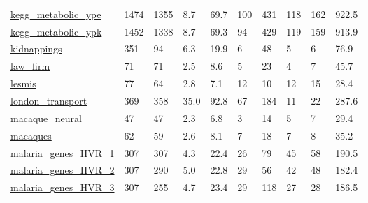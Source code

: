 \begin{longtable}{llllllllll}
 \href{http://santafe.edu/~aaronc/data/kegg2006_metabolic.zip}{kegg\_metabolic\_ype}                                          & 1474       & 1355  & 8.7    & 69.7   & 100   & 431    & 118    & 162    & 922.5   \\
 \href{http://santafe.edu/~aaronc/data/kegg2006_metabolic.zip}{kegg\_metabolic\_ypk}                                          & 1452       & 1338  & 8.7    & 69.3   & 94    & 429    & 119    & 159    & 913.9   \\
 \href{https://sites.google.com/site/ucinetsoftware/datasets/covert-networks/philippinekidnappings}{kidnappings}            & 351        & 94    & 6.3    & 19.9   & 6     & 48     & 5      & 6      & 76.9    \\
 \href{https://manliodedomenico.com/data.php}{law\_firm}                                                                     & 71         & 71    & 2.5    & 8.6    & 5     & 23     & 4      & 7      & 45.7    \\
 \href{http://www-personal.umich.edu/~mejn/netdata}{lesmis}                                                                 & 77         & 64    & 2.8    & 7.1    & 12    & 10     & 12     & 15     & 28.4    \\
 \href{https://manliodedomenico.com/data.php}{london\_transport}                                                             & 369        & 358   & 35.0   & 92.8   & 67    & 184    & 11     & 22     & 287.6   \\
 \href{https://sites.google.com/site/bctnet/datasets}{macaque\_neural}                                                       & 47         & 47    & 2.3    & 6.8    & 3     & 14     & 5      & 7      & 29.4    \\
 \href{http://konect.cc/networks/moreno_mac}{macaques}                                                                      & 62         & 59    & 2.6    & 8.1    & 7     & 18     & 7      & 8      & 35.2    \\
 \href{https://github.com/dblarremore/data_malaria_PLOSCompBiology_2013}{malaria\_genes\_HVR\_1}                               & 307        & 307   & 4.3    & 22.4   & 26    & 79     & 45     & 58     & 190.5   \\
 \href{https://github.com/dblarremore/data_malaria_PLOSCompBiology_2013}{malaria\_genes\_HVR\_2}                               & 307        & 290   & 5.0    & 22.8   & 29    & 56     & 42     & 48     & 182.4   \\
 \href{https://github.com/dblarremore/data_malaria_PLOSCompBiology_2013}{malaria\_genes\_HVR\_3}                               & 307        & 255   & 4.7    & 23.4   & 29    & 118    & 27     & 28     & 186.5   \\

\end{longtable}
